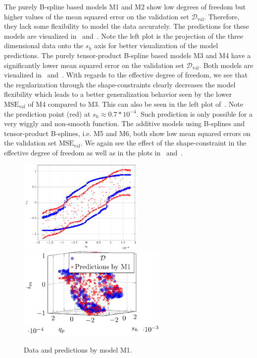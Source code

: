 The purely B-spline based models M1 and M2 show low degrees of freedom but higher values of the mean squared error on the validation set $\mathcal{D}_{\text{val}}$. Therefore, they lack some flexibility to model the data accurately. The predictions for these models are visualized in~ and~. Note the left plot is the projection of the three dimensional data onto the $s_h$ axis for better visualization of the model predictions. The purely tensor-product B-spline based models M3 and M4 have a significantly lower mean squared error on the validation set $\mathcal{D}_{\text{val}}$. Both models are visualized in~ and~. With regards to the effective degree of freedom, we see that the regularization through the shape-constraints clearly decreases the model flexibility which leads to a better generalization behavior seen by the lower $\text{MSE}_{\text{val}}$ of M4 compared to M3. This can also be seen in the left plot of~. Note the prediction point (red) at $s_h \approx 0.7*10^{-4}$. Such prediction is only possible for a very wiggly and non-smooth function. The additive models using B-splines and tensor-product B-splines, i.e. M5 and M6, both show low mean squared errors on the validation set $\text{MSE}_{\text{val}}$. We again see the effect of the shape-constraint in the effective degree of freedom as well as in the plots in~ and~. 

\begin{figure}[H]
	\centering 
	\includegraphics[height=4.5cm]{graphics/pgfplots/cha6/M1_2d.pdf}\quad
	\includegraphics[height=4.5cm]{graphics/pgfplots/cha6/M1_3d.pdf}
	\caption{Data and predictions by model M1.}
	\label{fig:bosch-M1}
\end{figure}

